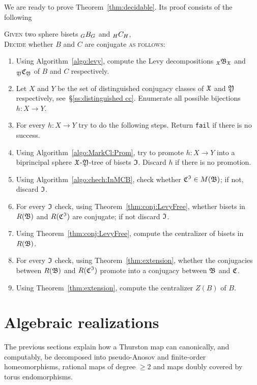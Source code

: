 \documentclass{amsart}
\begin{document}
\noindent We are ready to prove Theorem~\ref{thm:decidable}. Its proof
consists of the following
\begin{algo}\label{algo:Decid}
  \textsc{Given} two sphere bisets $\subscript G B_G$ and  $\subscript H C_H$,\\
  \textsc{Decide} whether $B$ and $C$ are conjugate \textsc{as follows:}\\\upshape
  \begin{enumerate}
  \item Using Algorithm~\ref{algo:levy}, compute the Levy
    decompositions $\subscript \gf\gfB_\gf$ and
    $\subscript \gfY\gfC_\gfY$ of $B$ and $C$
    respectively.
  \item Let $X$ and $Y$ be the set of distinguished conjugacy classes
    of ${\mathfrak X}$ and ${\mathfrak Y}$ respectively, see~\S\ref{ss:distinguished
      cc}. Enumerate all possible bijections $h\colon X\to Y$.
  \item For every $h\colon X\to Y$ try to do the following
    steps. Return \texttt{fail} if there is no success.
  \item Using Algorithm~\ref{algo:MarkCl:Prom}, try to promote
    $h\colon X\to Y$ into a biprincipal sphere ${\mathfrak X}$-${\mathfrak Y}$-tree of
    bisets ${\mathfrak I}$. Discard $h$ if there is no promotion.
  \item Using Algorithm~\ref{algo:chech:InMCB}, check whether
    ${\mathfrak C}^{\mathfrak I} \in M({\mathfrak B})$; if not, discard
    ${\mathfrak I}$.
  \item For every ${\mathfrak I}$ check, using
    Theorem~\ref{thm:conj:LevyFree}, whether bisets in $R({\mathfrak B})$
    and $R({\mathfrak C}^{\mathfrak I})$ are conjugate; if not discard
    ${\mathfrak I}$.
  \item Using Theorem~\ref{thm:conj:LevyFree}, compute the centralizer
    of bisets in $R({\mathfrak B})$.
  \item For every ${\mathfrak I}$ check, using Theorem~\ref{thm:extension},
    whether the conjugacies between $R({\mathfrak B})$ and $R({\mathfrak C}^{\mathfrak I})$
    promote into a conjugacy between ${\mathfrak B}$ and ${\mathfrak C}$.
  \item Using Theorem~\ref{thm:extension}, compute the centralizer
    $Z(B)$ of $B$.
  \end{enumerate}
\end{algo}

\section{Algebraic realizations}\label{ss:examples}
The previous sections explain how a Thurston map can canonically, and
computably, be decomposed into pseudo-Anosov and finite-order
homeomorphisms, rational maps of degree $\ge2$ and maps doubly covered
by torus endomorphisms.
\end{document}

